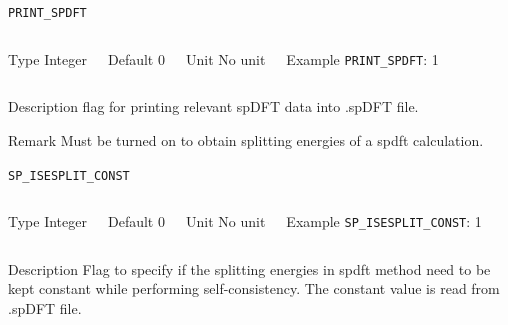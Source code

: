 \begin{frame}[allowframebreaks]{\texttt{PRINT\_SPDFT}} \label{PRINT_SPDFT}
\vspace*{-12pt}
\begin{columns}
\begin{block}{Type}
Integer
\end{block}

\begin{block}{Default}
0
\end{block}

\begin{block}{Unit}
No unit
\end{block}

\begin{block}{Example}
\texttt{PRINT\_SPDFT}: 1
\end{block}
\end{columns}

\begin{block}{Description}
flag for printing relevant spDFT data into .spDFT file.
\end{block}

\begin{block}{Remark}
Must be turned on to obtain splitting energies of a spdft calculation.
\end{block}

\end{frame}


\begin{frame}[allowframebreaks]{\texttt{SP\_ISESPLIT\_CONST}} \label{SP_ISESPLIT_CONST}
\vspace*{-12pt}
\begin{columns}
\begin{block}{Type}
Integer
\end{block}

\begin{block}{Default}
0
\end{block}

\begin{block}{Unit}
No unit
\end{block}

\begin{block}{Example}
\texttt{SP\_ISESPLIT\_CONST}: 1
\end{block}
\end{columns}

\begin{block}{Description}
Flag to specify if the splitting energies in spdft method need to be kept constant while performing self-consistency. The constant value is read from .spDFT file. 
\end{block}

\end{frame}
